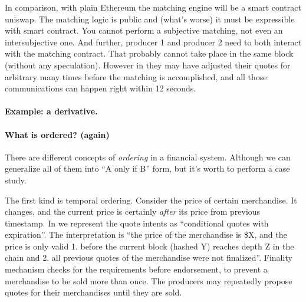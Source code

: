 
In comparison, with plain Ethereum the matching engine will be a smart contract \eg uniswap.
The matching logic is public and (what's worse) it must be expressible with smart contract.
You cannot perform a subjective matching, not even an intersubjective one.
And further, producer 1 and producer 2 need to both interact with the matching contract.
That probably cannot take place in the same block (without any speculation).
However in \sys they may have adjusted their quotes for arbitrary many times before the matching is accomplished, and all those communications can happen right within 12 seconds.

\paragraph{Example: a derivative.}

\paragraph{What is ordered? (again)}
There are different concepts of \emph{ordering} in a financial system.
Although we can generalize all of them into ``A only if B'' form, but it's worth to perform a case study.

The first kind is temporal ordering.
Consider the price of certain merchandise.
It changes, and the current price is certainly \emph{after} its price from previous timestamp.
In \sys we represent the quote intents as ``conditional quotes with expiration''.
The interpretation is ``the price of the merchandise is \$X, and the price is only valid 1. before the current block (hashed Y) reaches depth Z in the chain and 2. all previous quotes of the merchandise were not finalized''.
Finality mechanism checks for the requirements before endorsement, to prevent a merchandise to be sold more than once.
The producers may repeatedly propose quotes for their merchandises until they are sold.

